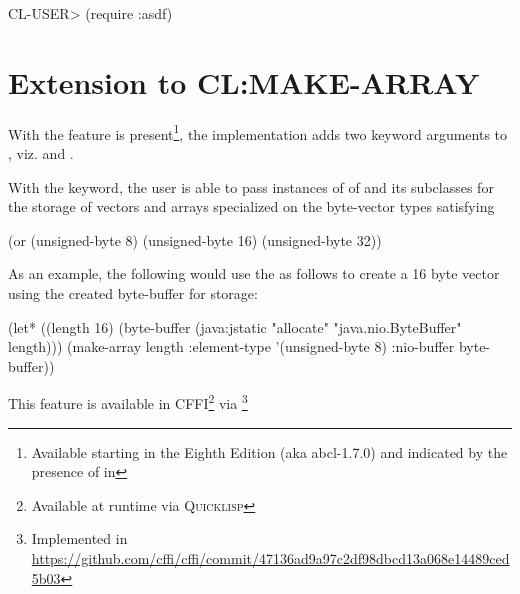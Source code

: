 \documentclass[10pt]{book}
\begin{document}
\begin{listing-lisp}
CL-USER> (require :asdf)
\end{listing-lisp}

\section{Extension to CL:MAKE-ARRAY}
\label{section:make-array}

With the  feature is present\footnote{Available starting in
the Eighth Edition (aka abcl-1.7.0) and indicated by the presence of
 in }, the implementation adds two
keyword arguments to , viz.  and
.

With the  keyword, the user is able to pass
instances of of  and its subclasses for the
storage of vectors and arrays specialized on the byte-vector
types satisfying

\begin{listing-lisp}
  (or
    (unsigned-byte 8)
    (unsigned-byte 16)
    (unsigned-byte 32))
\end{listing-lisp}

As an example, the following would use the  as
follows to create a 16 byte vector using the created byte-buffer for
storage:

\begin{listing-lisp}
  (let* ((length 16)
         (byte-buffer (java:jstatic "allocate" "java.nio.ByteBuffer" length)))
    (make-array length :element-type '(unsigned-byte 8) :nio-buffer byte-buffer))
\end{listing-lisp}

This feature is available in CFFI\footnote{Available at runtime via
\textsc{Quicklisp}} via
\footnote{Implemented in
\url{https://github.com/cffi/cffi/commit/47136ad9a97c2df98dbcd13a068e14489ced5b03}}
\end{document}
